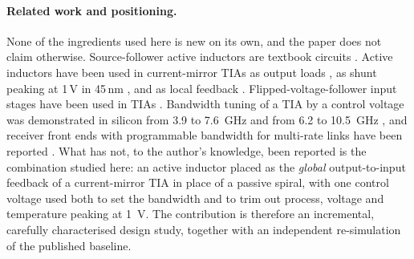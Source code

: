 \documentclass[11pt,a4paper]{article}
\begin{document}
\paragraph{Related work and positioning.} None of the ingredients used here is new on its own, and the paper does not claim otherwise. Source-follower active inductors are textbook circuits \cite{yuan,razaviai}. Active inductors have been used in current-mirror TIAs as output loads \cite{zohoori}, as shunt peaking at 1\,V in 45\,nm \cite{shaaban}, and as local feedback \cite{alberwari,issa,alyas}. Flipped-voltage-follower input stages have been used in TIAs \cite{gungordu}. Bandwidth tuning of a TIA by a control voltage was demonstrated in silicon from 3.9 to \SI{7.6}{GHz} \cite{hwang} and from 6.2 to \SI{10.5}{GHz} \cite{chien}, and receiver front ends with programmable bandwidth for multi-rate links have been reported \cite{dash}. What has not, to the author's knowledge, been reported is the combination studied here: an active inductor placed as the \emph{global} output-to-input feedback of a current-mirror TIA in place of a passive spiral, with one control voltage used both to set the bandwidth and to trim out process, voltage and temperature peaking at \SI{1}{V}. The contribution is therefore an incremental, carefully characterised design study, together with an independent re-simulation of the published baseline.
\end{document}
